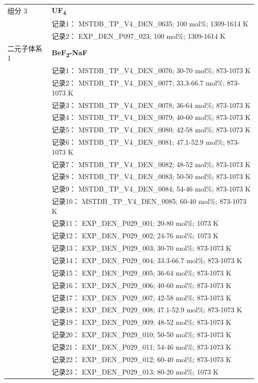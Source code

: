 \documentclass[12pt]{article}
\begin{document}
{\begin{longtable}[]{@{}
  >{\raggedright\arraybackslash}p{}
  >{\raggedright\arraybackslash}p{}@{}}
组分 3  & \textbf{UF\textsubscript{4}} \\
 & 记录1： MSTDB\_TP\_V4\_DEN\_0635; 100 mol\%; 1309-1614 K \\
 & 记录2： EXP\_DEN\_P097\_023; 100 mol\%; 1309-1614 K  \\

二元子体系 1  & \textbf{BeF\textsubscript{2}-NaF} \\
 & 记录1： MSTDB\_TP\_V4\_DEN\_0076; 30-70 mol\%; 873-1073 K \\
 & 记录2： MSTDB\_TP\_V4\_DEN\_0077; 33.3-66.7 mol\%; 873-1073 K \\
 & 记录3： MSTDB\_TP\_V4\_DEN\_0078; 36-64 mol\%; 873-1073 K \\
 & 记录4： MSTDB\_TP\_V4\_DEN\_0079; 40-60 mol\%; 873-1073 K \\
 & 记录5： MSTDB\_TP\_V4\_DEN\_0080; 42-58 mol\%; 873-1073 K \\
 & 记录6： MSTDB\_TP\_V4\_DEN\_0081; 47.1-52.9 mol\%; 873-1073 K \\
 & 记录7： MSTDB\_TP\_V4\_DEN\_0082; 48-52 mol\%; 873-1073 K \\
 & 记录8： MSTDB\_TP\_V4\_DEN\_0083; 50-50 mol\%; 873-1073 K \\
 & 记录9： MSTDB\_TP\_V4\_DEN\_0084; 54-46 mol\%; 873-1073 K \\
 & 记录10： MSTDB\_TP\_V4\_DEN\_0085; 60-40 mol\%; 873-1073 K \\
 & 记录11： EXP\_DEN\_P029\_001; 20-80 mol\%; 1073 K \\
 & 记录12： EXP\_DEN\_P029\_002; 24-76 mol\%; 1073 K \\
 & 记录13： EXP\_DEN\_P029\_003; 30-70 mol\%; 873-1073 K \\
 & 记录14： EXP\_DEN\_P029\_004; 33.3-66.7 mol\%; 873-1073 K \\
 & 记录15： EXP\_DEN\_P029\_005; 36-64 mol\%; 873-1073 K \\
 & 记录16： EXP\_DEN\_P029\_006; 40-60 mol\%; 873-1073 K \\
 & 记录17： EXP\_DEN\_P029\_007; 42-58 mol\%; 873-1073 K \\
 & 记录18： EXP\_DEN\_P029\_008; 47.1-52.9 mol\%; 873-1073 K \\
 & 记录19： EXP\_DEN\_P029\_009; 48-52 mol\%; 873-1073 K \\
 & 记录20： EXP\_DEN\_P029\_010; 50-50 mol\%; 873-1073 K \\
 & 记录21： EXP\_DEN\_P029\_011; 54-46 mol\%; 873-1073 K \\
 & 记录22： EXP\_DEN\_P029\_012; 60-40 mol\%; 873-1073 K \\
 & 记录23： EXP\_DEN\_P029\_013; 80-20 mol\%; 1073 K  \\


\end{longtable}}
\end{document}
